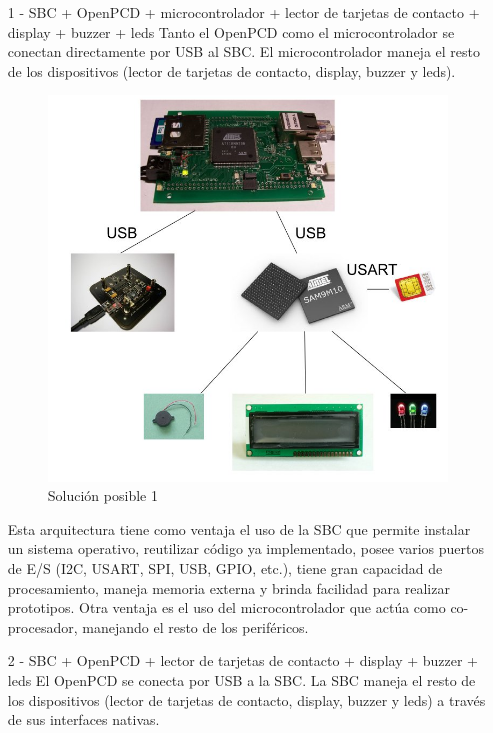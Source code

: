 \begin{itemize}
\item[1 -] SBC + OpenPCD + microcontrolador + lector de tarjetas de contacto + display + buzzer + leds
Tanto el OpenPCD como el microcontrolador se conectan directamente por USB al SBC. El microcontrolador maneja el resto de los dispositivos (lector de tarjetas de contacto, display, buzzer y leds).

\begin{figure}[H]
\centering
  \begin{center}
  \includegraphics[scale=.25]{Imagenes/1.jpg} 
  \end{center}
  \caption{Solución posible 1}\label{Fig:HW} 
\end{figure}

Esta arquitectura tiene como ventaja el uso de la SBC que permite instalar un sistema operativo, reutilizar código ya implementado, posee varios puertos de E/S (I2C, USART, SPI, USB, GPIO, etc.), tiene gran capacidad de procesamiento, maneja memoria externa y brinda facilidad para realizar prototipos. Otra ventaja es el uso del microcontrolador que actúa como co-procesador, manejando el resto de los periféricos.

\item[2 -] SBC + OpenPCD + lector de tarjetas de contacto + display + buzzer + leds
El OpenPCD se conecta por USB a la SBC. La SBC maneja el resto de los dispositivos (lector de tarjetas de contacto, display, buzzer y leds) a través de sus interfaces nativas.


\end{itemize}
